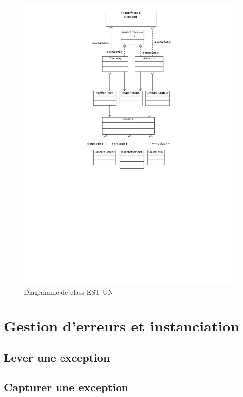 \documentclass[a4paper,11pt]{article}
\begin{document}
\begin{figure}

    \caption{Diagramme de class EST-UN}
    \includegraphics[scale=0.4]{est-un2.png}

\end{figure}


\section{Gestion d’erreurs et instanciation}

\subsection{Lever une exception}

\subsection{Capturer une exception}
\end{document}
